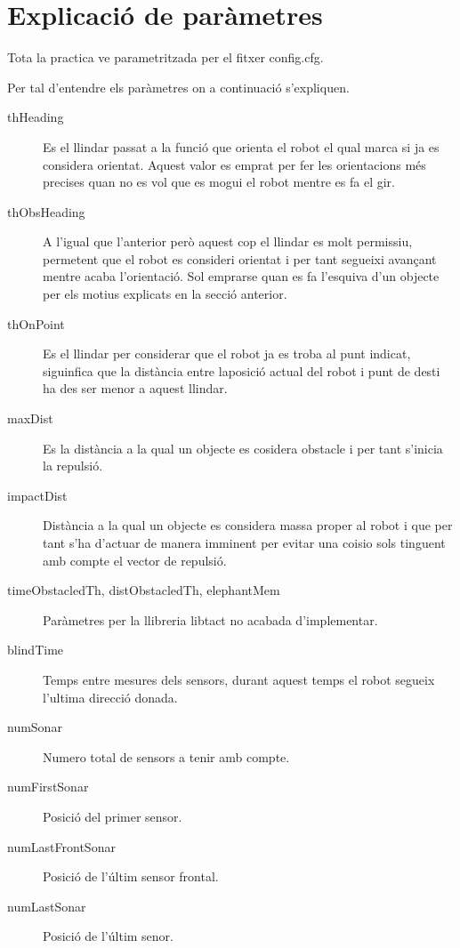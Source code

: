 \section{Explicació de paràmetres}

Tota la practica ve parametritzada per el fitxer config.cfg.

Per tal d'entendre els paràmetres on a continuació s'expliquen.

\begin{description}
 \item[thHeading] Es el llindar passat a la funció que orienta el robot el qual marca si ja es considera orientat.
Aquest valor es emprat per fer les orientacions més precises quan no es vol que es mogui el robot mentre es fa el gir.
  \item[thObsHeading] A l'igual que l'anterior però aquest cop el llindar es molt permissiu, permetent que el robot
es consideri orientat i per tant segueixi avançant mentre acaba l'orientació. Sol emprarse quan es fa l'esquiva
d'un objecte per els motius explicats en la secció anterior.

 \item[thOnPoint] Es el llindar per considerar que el robot ja es troba al punt indicat, siguinfica que la distància
entre laposició actual del robot i punt de desti ha des ser menor a aquest llindar. 

 \item[maxDist] Es la distància a la qual un objecte es cosidera obstacle i per tant s'inicia la repulsió.
 \item[impactDist] Distància a la qual un objecte es considera massa proper al robot i que per tant s'ha
d'actuar de manera imminent per evitar una co\lgem isio sols tinguent amb compte el vector de repulsió.

 \item[timeObstacledTh, distObstacledTh, elephantMem] Paràmetres per la llibreria libtact no acabada d'implementar.
 \item[blindTime] Temps entre mesures dels sensors, durant aquest temps el robot segueix l'ultima direcció donada.
 
  \item[numSonar] Numero total de sensors a tenir amb compte.
  \item[numFirstSonar] Posició del primer sensor.
  \item[numLastFrontSonar] Posició de l'últim sensor frontal.
  \item[numLastSonar] Posició de l'últim senor.


\end{description}
